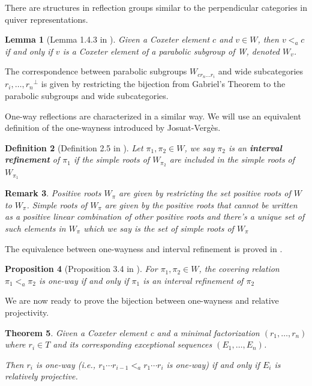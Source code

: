 \documentclass[11pt]{amsart}
\newtheorem{thm}{Theorem}[section]
\newtheorem{defi}[thm]{Definition}%
\newtheorem{lemma}[thm]{Lemma}%
\newtheorem{prop}[thm]{Proposition}%
\newtheorem{rema}[thm]{Remark}%
\begin{document}
There are structures in reflection groups similar to the perpendicular categories in quiver representations.

\begin{lemma}[Lemma 1.4.3 in \cite{BESSIS2003647}]
    Given a Coxeter element $c$ and $v\in W$, then $v <_a c$ if and only if $v$ is a Coxeter element of a parabolic subgroup of W, denoted $W_v$.
\end{lemma}

The correspondence between parabolic subgroups $W_{cr_n\dots r_i}$ and wide subcategories ${r_i,\dots,r_n}^\perp$ is given by restricting the bijection from Gabriel's Theorem to the parabolic subgroups and wide subcategories.

One-way reflections are characterized in a similar way. We will use an equivalent definition of the one-wayness introduced by Josuat-Verg\`es.

\begin{defi}[Definition 2.5 in \cite{MR3395490}]
    Let $\pi_1,\pi_2 \in W$, we say $\pi_2$ is an \textbf{interval refinement} of $\pi_1$ if the simple roots of $W_{\pi_2}$ are included in the simple roots of $W_{\pi_1}$
\end{defi}

\begin{rema}
    Positive roots $W_\pi$ are given by restricting the set positive roots of $W$ to $W_{\pi}$. Simple roots of $W_{\pi}$ are given by the positive roots that cannot be written as a positive linear combination of other positive roots and there's a unique set of such elements in $W_\pi$ which we say is the set of simple roots of $W_\pi$
\end{rema}

The equivalence between one-wayness and interval refinement is proved in \cite{MR3395490}.

\begin{prop}[Proposition 3.4 in \cite{biane2019noncrossing}]
    For $\pi_1, \pi_2 \in W$, the covering relation $\pi_1 <_a \pi_2$ is one-way if and only if $\pi_1$ is an interval refinement of $\pi_2$
\end{prop}



We are now ready to prove the bijection between one-wayness and relative projectivity.

\begin{thm}\label{thm A}
    Given a Coxeter element c and a minimal factorization $(r_1,\dots,r_n)$ where $r_i \in T$ and its corresponding exceptional sequences $(E_1,\dots,E_n)$.

    Then $r_i$ is one-way (i.e., $r_1\cdots r_{i-1}<_a r_1\cdots r_i$ is one-way) if and only if $E_i$ is relatively projective.
\end{thm}
\end{document}
